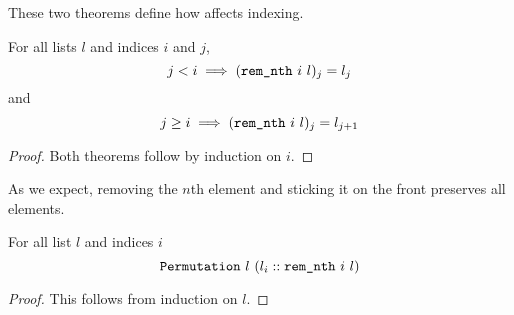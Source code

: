 \documentclass[sigplan,10pt,anonymous,review]{thesis}
\begin{document}
These two theorems define how  affects indexing.
\begin{theorem}
  For all lists $l$ and indices $i$ and $j$,
  \begin{equation*}
    j < i \implies (\texttt{\textup{rem\_nth}}~i~l)_j = l_j
  \end{equation*}
  and
  \begin{equation*}
    j \ge i \implies (\texttt{\textup{rem\_nth}}~i~l)_j = l_{j+1}
  \end{equation*}
\end{theorem}
\begin{proof}
  Both theorems follow by induction on $i$.
\end{proof}

As we expect, removing the $n$th element and sticking it on the front
preserves all elements.
\begin{theorem}
  For all list $l$ and indices $i$
  \begin{equation*}
    \texttt{\textup{Permutation}}~l~(l_i :: \texttt{\textup{rem\_nth}}~i~l)
  \end{equation*}
\end{theorem}
\begin{proof}
  This follows from induction on $l$.
\end{proof}
\end{document}
